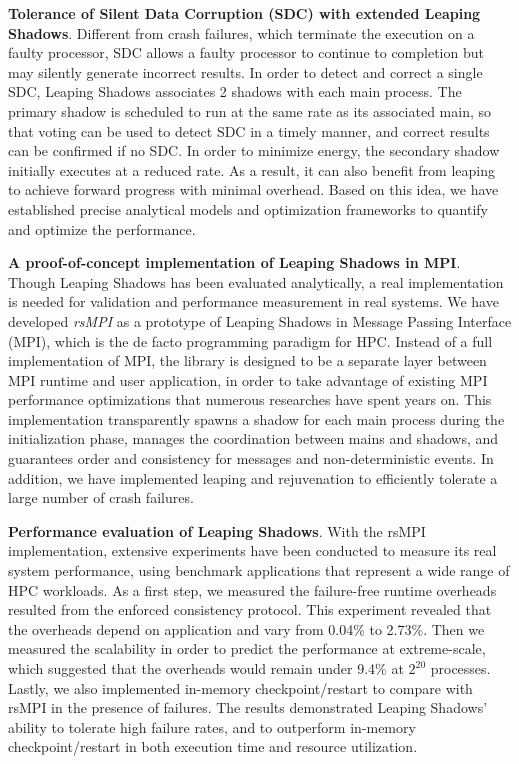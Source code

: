 \textbf{Tolerance of Silent Data Corruption (SDC) with extended Leaping Shadows}.
Different from crash failures, which terminate the execution on a faulty processor, SDC allows a faulty processor to continue to completion but may silently generate incorrect results. In order to detect and correct a single SDC, Leaping Shadows associates 2 shadows with each main process. The primary shadow is scheduled to run at the same rate as its associated main, so that voting can be used to detect SDC in a timely manner, and correct results can be confirmed if no SDC. In order to minimize energy, the secondary shadow initially executes at a reduced rate. As a result, it can also benefit from leaping to achieve forward progress with minimal overhead. Based on this idea, we have established precise analytical models and optimization frameworks to
quantify and optimize the performance. 

\textbf{A proof-of-concept implementation of Leaping Shadows in MPI}.
Though Leaping Shadows has been evaluated analytically, a real implementation 
is needed for validation and performance measurement in real systems. We have developed \textit{rsMPI} as a prototype of Leaping Shadows in Message Passing Interface (MPI), which is the de facto programming paradigm for HPC. 
Instead of a full implementation of MPI, the library is designed to be a separate layer between MPI runtime and user application, in order to take advantage of existing MPI performance optimizations that numerous researches have spent years on. 
This implementation transparently spawns 
a shadow for each main process during the initialization phase, manages the coordination between mains and shadows, 
and guarantees order and consistency for messages and non-deterministic events. 
In addition, we have implemented leaping and rejuvenation to efficiently tolerate a large number of crash failures. 


\textbf{Performance evaluation of Leaping Shadows}.
With the rsMPI implementation, extensive experiments have been conducted to measure its real system performance, using benchmark applications that represent a wide range of HPC workloads. As a first step, we measured the failure-free runtime overheads resulted from the enforced consistency protocol. This experiment revealed that the overheads depend on application and vary from 0.04\% to 2.73\%. Then we measured the scalability in order to predict the performance at extreme-scale, which suggested that the overheads would remain under 9.4\% at $2^{20}$ processes. Lastly, we also implemented in-memory checkpoint/restart to compare with rsMPI in the presence of failures. The results demonstrated Leaping Shadows'
ability to tolerate high failure rates, and to outperform in-memory checkpoint/restart in both execution time and
resource utilization.

